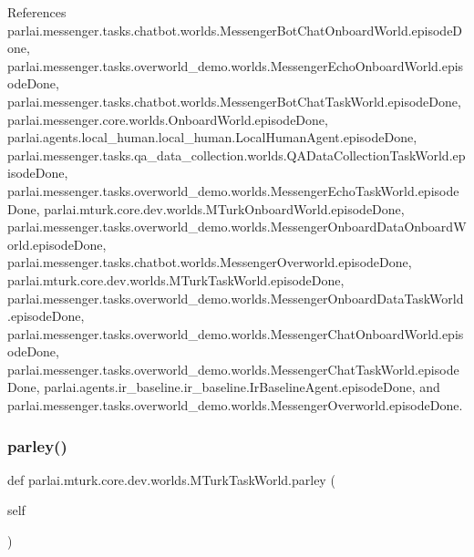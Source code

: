References parlai.\+messenger.\+tasks.\+chatbot.\+worlds.\+Messenger\+Bot\+Chat\+Onboard\+World.\+episode\+Done, parlai.\+messenger.\+tasks.\+overworld\+\_\+demo.\+worlds.\+Messenger\+Echo\+Onboard\+World.\+episode\+Done, parlai.\+messenger.\+tasks.\+chatbot.\+worlds.\+Messenger\+Bot\+Chat\+Task\+World.\+episode\+Done, parlai.\+messenger.\+core.\+worlds.\+Onboard\+World.\+episode\+Done, parlai.\+agents.\+local\+\_\+human.\+local\+\_\+human.\+Local\+Human\+Agent.\+episode\+Done, parlai.\+messenger.\+tasks.\+qa\+\_\+data\+\_\+collection.\+worlds.\+Q\+A\+Data\+Collection\+Task\+World.\+episode\+Done, parlai.\+messenger.\+tasks.\+overworld\+\_\+demo.\+worlds.\+Messenger\+Echo\+Task\+World.\+episode\+Done, parlai.\+mturk.\+core.\+dev.\+worlds.\+M\+Turk\+Onboard\+World.\+episode\+Done, parlai.\+messenger.\+tasks.\+overworld\+\_\+demo.\+worlds.\+Messenger\+Onboard\+Data\+Onboard\+World.\+episode\+Done, parlai.\+messenger.\+tasks.\+chatbot.\+worlds.\+Messenger\+Overworld.\+episode\+Done, parlai.\+mturk.\+core.\+dev.\+worlds.\+M\+Turk\+Task\+World.\+episode\+Done, parlai.\+messenger.\+tasks.\+overworld\+\_\+demo.\+worlds.\+Messenger\+Onboard\+Data\+Task\+World.\+episode\+Done, parlai.\+messenger.\+tasks.\+overworld\+\_\+demo.\+worlds.\+Messenger\+Chat\+Onboard\+World.\+episode\+Done, parlai.\+messenger.\+tasks.\+overworld\+\_\+demo.\+worlds.\+Messenger\+Chat\+Task\+World.\+episode\+Done, parlai.\+agents.\+ir\+\_\+baseline.\+ir\+\_\+baseline.\+Ir\+Baseline\+Agent.\+episode\+Done, and parlai.\+messenger.\+tasks.\+overworld\+\_\+demo.\+worlds.\+Messenger\+Overworld.\+episode\+Done.

\mbox{\label{classparlai_1_1mturk_1_1core_1_1dev_1_1worlds_1_1MTurkTaskWorld_af26e4a1fe60215bdfb24d66c52d6aa8e}} 
\subsubsection{\texorpdfstring{parley()}{parley()}}
{\footnotesize\ttfamily def parlai.\+mturk.\+core.\+dev.\+worlds.\+M\+Turk\+Task\+World.\+parley (\begin{DoxyParamCaption}\item[{}]{self }\end{DoxyParamCaption})}

